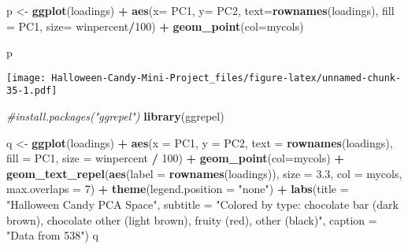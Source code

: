 \documentclass[
]{article}
\newenvironment{Shaded}{\begin{snugshade}}{\end{snugshade}}
\newcommand{\AttributeTok}[1]{\textcolor[rgb]{0.13,0.29,0.53}{#1}}
\newcommand{\CommentTok}[1]{\textcolor[rgb]{0.56,0.35,0.01}{\textit{#1}}}
\newcommand{\DecValTok}[1]{\textcolor[rgb]{0.00,0.00,0.81}{#1}}
\newcommand{\FloatTok}[1]{\textcolor[rgb]{0.00,0.00,0.81}{#1}}
\newcommand{\FunctionTok}[1]{\textcolor[rgb]{0.13,0.29,0.53}{\textbf{#1}}}
\newcommand{\NormalTok}[1]{#1}
\newcommand{\OtherTok}[1]{\textcolor[rgb]{0.56,0.35,0.01}{#1}}
\newcommand{\SpecialCharTok}[1]{\textcolor[rgb]{0.81,0.36,0.00}{\textbf{#1}}}
\newcommand{\StringTok}[1]{\textcolor[rgb]{0.31,0.60,0.02}{#1}}
\begin{document}
\begin{Shaded}
\begin{Highlighting}[]
\NormalTok{p }\OtherTok{\textless{}{-}} \FunctionTok{ggplot}\NormalTok{(loadings) }\SpecialCharTok{+}
  \FunctionTok{aes}\NormalTok{(}\AttributeTok{x=}\NormalTok{ PC1, }\AttributeTok{y=}\NormalTok{ PC2, }
      \AttributeTok{text=}\FunctionTok{rownames}\NormalTok{(loadings), }\AttributeTok{fill =}\NormalTok{ PC1, }\AttributeTok{size=}\NormalTok{ winpercent}\SpecialCharTok{/}\DecValTok{100}\NormalTok{) }\SpecialCharTok{+}
  \FunctionTok{geom\_point}\NormalTok{(}\AttributeTok{col=}\NormalTok{mycols)}
  
\NormalTok{  p}
\end{Highlighting}
\end{Shaded}

\texttt{[image: Halloween-Candy-Mini-Project\_files/figure-latex/unnamed-chunk-35-1.pdf]}

\begin{Shaded}
\begin{Highlighting}[]
\CommentTok{\#install.packages("ggrepel")}
\FunctionTok{library}\NormalTok{(ggrepel)}

\NormalTok{q }\OtherTok{\textless{}{-}} \FunctionTok{ggplot}\NormalTok{(loadings) }\SpecialCharTok{+}
  \FunctionTok{aes}\NormalTok{(}\AttributeTok{x =}\NormalTok{ PC1, }\AttributeTok{y =}\NormalTok{ PC2, }\AttributeTok{text =} \FunctionTok{rownames}\NormalTok{(loadings), }\AttributeTok{fill =}\NormalTok{ PC1, }\AttributeTok{size =}\NormalTok{ winpercent }\SpecialCharTok{/} \DecValTok{100}\NormalTok{) }\SpecialCharTok{+}
  \FunctionTok{geom\_point}\NormalTok{(}\AttributeTok{col=}\NormalTok{mycols) }\SpecialCharTok{+}
  \FunctionTok{geom\_text\_repel}\NormalTok{(}\FunctionTok{aes}\NormalTok{(}\AttributeTok{label =} \FunctionTok{rownames}\NormalTok{(loadings)), }\AttributeTok{size =} \FloatTok{3.3}\NormalTok{, }\AttributeTok{col =}\NormalTok{ mycols, }\AttributeTok{max.overlaps =} \DecValTok{7}\NormalTok{) }\SpecialCharTok{+} 
  \FunctionTok{theme}\NormalTok{(}\AttributeTok{legend.position =} \StringTok{"none"}\NormalTok{) }\SpecialCharTok{+}
  \FunctionTok{labs}\NormalTok{(}\AttributeTok{title =} \StringTok{"Halloween Candy PCA Space"}\NormalTok{, }\AttributeTok{subtitle =} \StringTok{"Colored by type: chocolate bar (dark brown), chocolate other (light brown), fruity (red), other (black)"}\NormalTok{,}
    \AttributeTok{caption =} \StringTok{"Data from 538"}\NormalTok{)}
\NormalTok{q}
\end{Highlighting}
\end{Shaded}
\end{document}

